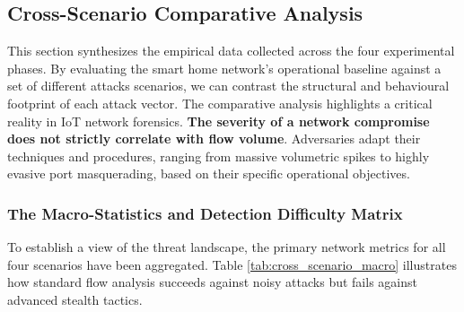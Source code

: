 \subsection{Cross-Scenario Comparative Analysis}

This section synthesizes the empirical data collected across the four experimental phases. By evaluating the smart home network's operational baseline against a set of different attacks scenarios, we can contrast the structural and behavioural footprint of each attack vector. The comparative analysis highlights a critical reality in IoT network forensics. \textbf{The severity of a network compromise does not strictly correlate with flow volume}. Adversaries adapt their techniques and procedures, ranging from massive volumetric spikes to highly evasive port masquerading, based on their specific operational objectives.

\subsubsection{The Macro-Statistics and Detection Difficulty Matrix}

To establish a view of the threat landscape, the primary network metrics for all four scenarios have been aggregated. Table \ref{tab:cross_scenario_macro} illustrates how standard flow analysis succeeds against noisy attacks but fails against advanced stealth tactics.

\begin{table}[H]
	\centering
	\renewcommand{\arraystretch}{1.3}
	\caption{Macro-Statistics and Detection Difficulty Matrix across all experimental scenarios.}
	\label{tab:cross_scenario_macro}
\end{table}

